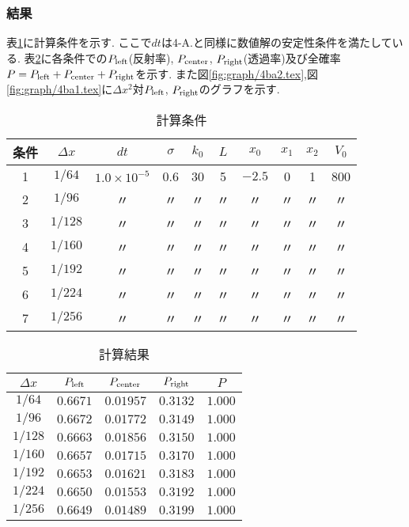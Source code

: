 \subsubsection*{結果}
表\ref{tab:4ad_cond}に計算条件を示す.
ここで$dt$は4-A.と同様に数値解の安定性条件を満たしている.
表\ref{tab:4ad_res}に各条件での$P_{\rm left}$(反射率), $P_{\rm center}$, $P_{\rm right}$(透過率)及び全確率$P=P_{\rm left}+P_{\rm center}+P_{\rm right}$を示す.
また図\ref{fig:graph/4ba2.tex},図\ref{fig:graph/4ba1.tex}に$\Delta x^2$対$P_{\rm left}$, $P_{\rm right}$のグラフを示す.
\begin{table}[h]
  \caption{計算条件}
  \label{tab:4ad_cond}
  \centering
  \begin{tabular}{cccccccccc}
  \hline
  条件&$\Delta x$&$dt$&$\sigma$&$k_0$&$L$&$x_0$&$x_1$&$x_2$&$V_0$\\
  \hline \hline
  1&$1/64 $&$1.0\times 10^{-5}$&0.6&30&5&$-2.5$&0&1&800\\
  2&$1/96 $&〃&〃&〃&〃&〃&〃&〃&〃\\
  3&$1/128$&〃&〃&〃&〃&〃&〃&〃&〃\\
  4&$1/160$&〃&〃&〃&〃&〃&〃&〃&〃\\
  5&$1/192$&〃&〃&〃&〃&〃&〃&〃&〃\\
  6&$1/224$&〃&〃&〃&〃&〃&〃&〃&〃\\
  7&$1/256$&〃&〃&〃&〃&〃&〃&〃&〃\\
  \hline
  \end{tabular}
\end{table}
\begin{table}[h]
  \caption{計算結果}
  \label{tab:4ad_res}
  \centering
  \begin{tabular}{ccccc}
  \hline
  $\Delta x$&$P_{\rm left}$&$P_{\rm center}$&$P_{\rm right}$&$P$\\
  \hline \hline
  $1/64 $&$0.6671$&$0.01957$&$0.3132$&$1.000$\\
  $1/96 $&$0.6672$&$0.01772$&$0.3149$&$1.000$\\
  $1/128$&$0.6663$&$0.01856$&$0.3150$&$1.000$\\
  $1/160$&$0.6657$&$0.01715$&$0.3170$&$1.000$\\
  $1/192$&$0.6653$&$0.01621$&$0.3183$&$1.000$\\
  $1/224$&$0.6650$&$0.01553$&$0.3192$&$1.000$\\
  $1/256$&$0.6649$&$0.01489$&$0.3199$&$1.000$\\
  \hline
  \end{tabular}
\end{table}
